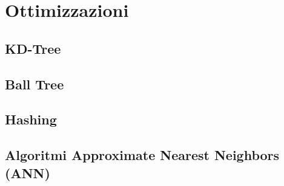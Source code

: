\section{Ottimizzazioni}
\label{sec:ottimizzazioni}

\subsection{KD-Tree}
\label{subsec:kd_tree}

\subsection{Ball Tree}
\label{subsec:ball_tree}

\subsection{Hashing}
\label{subsec:hashing}

\subsection{Algoritmi Approximate Nearest Neighbors (ANN)}
\label{subsec:approximate_nearest_neighbors}
